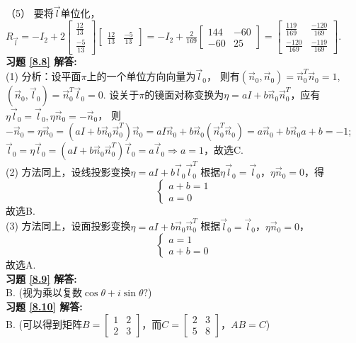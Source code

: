 （5） 要将$\vec{l}$单位化，\\
      $R_{\vec{l}} =-I_2+2\begin{bmatrix}\frac{12}{13}\\ \frac{-5}{13}\end{bmatrix}
      \begin{bmatrix}\frac{12}{13}&\frac{-5}{13}\end{bmatrix}=-I_2+\frac{2}{169}\begin{bmatrix}144&-60\\-60&25\end{bmatrix}=
      \begin{bmatrix}\frac{119}{169}&\frac{-120}{169}\\ \frac{-120}{169}&\frac{-119}{169}\end{bmatrix}.$\\
\textbf{习题 \ref{8.8} 解答:}\\
(1) 分析：设平面$\pi$上的一个单位方向向量为$\vec{l}_0$，
则有$(\vec{n}_0,\vec{n}_0)=\vec{n}_0^T\vec{n}_0=1$,$(\vec{n}_0,\vec{l}_0)=\vec{n}_0^T\vec{l}_0=0$.
设关于$\pi$的镜面对称变换为$\eta=aI+b\vec{n}_0\vec{n}_0^T$，应有$\eta\vec{l}_0=\vec{l}_0,\eta\vec{n}_0=-\vec{n}_0$，
则$-\vec{n}_0=\eta\vec{n}_0=(aI+b\vec{n}_0\vec{n}_0^T)\vec{n}_0=aI\vec{n}_0+b\vec{n}_0 (\vec{n}_0^T\vec{n}_0)=a\vec{n}_0
+b\vec{n}_0a+b=-1$; $\vec{l}_0=\eta\vec{l}_0=(aI+b\vec{n}_0\vec{n}_0^T )\vec{l}_0=a\vec{l}_0 \Rightarrow a=1$，故选C.\\
(2)  方法同上，设线投影变换$\eta=aI+b\vec{l}_0\vec{l}_0^T$ 根据$\eta\vec{l}_0=\vec{l}_0$，$\eta\vec{n}_0=0$，得
\begin{equation*}\begin{cases}a+b=1\\a=0\end{cases}\end{equation*}
故选B.\\
(3)  方法同上，设面投影变换$\eta=aI+b\vec{n}_0 \vec{n}_0^T$ 根据$\vec{l}_0=\vec{l}_0$，$\eta\vec{n}_0=0$，
\begin{equation*}\begin{cases}a=1\\a+b=0\end{cases}\end{equation*}
故选A.\\
\textbf{习题 \ref{8.9} 解答:}\\
B.  (视为乘以复数$\cos\theta+i\sin\theta?$)\\
\textbf{习题 \ref{8.10} 解答:}\\
B.  (可以得到矩阵$B=\begin{bmatrix}1&2\\2&3\end{bmatrix}$，而$C=\begin{bmatrix}2&3\\5&8\end{bmatrix}$，$AB=C$)\\
